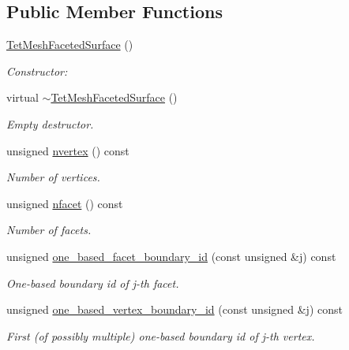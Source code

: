 \subsection*{Public Member Functions}
\begin{DoxyCompactItemize}
\item 
\hyperlink{classoomph_1_1TetMeshFacetedSurface_ab11f1e6e44a264849600909929c2067f}{Tet\+Mesh\+Faceted\+Surface} ()
\begin{DoxyCompactList}\small\item\em Constructor\+: \end{DoxyCompactList}\item 
virtual \hyperlink{classoomph_1_1TetMeshFacetedSurface_addb5688daf76ee730092f428162f9056}{$\sim$\+Tet\+Mesh\+Faceted\+Surface} ()
\begin{DoxyCompactList}\small\item\em Empty destructor. \end{DoxyCompactList}\item 
unsigned \hyperlink{classoomph_1_1TetMeshFacetedSurface_aae77dfb3a856e3840564e21716f4c3b1}{nvertex} () const
\begin{DoxyCompactList}\small\item\em Number of vertices. \end{DoxyCompactList}\item 
unsigned \hyperlink{classoomph_1_1TetMeshFacetedSurface_a6036f2a5e11bea9d72f9bba9a89faec7}{nfacet} () const
\begin{DoxyCompactList}\small\item\em Number of facets. \end{DoxyCompactList}\item 
unsigned \hyperlink{classoomph_1_1TetMeshFacetedSurface_a86b099447be23301fdfd4abdeee75560}{one\+\_\+based\+\_\+facet\+\_\+boundary\+\_\+id} (const unsigned \&j) const
\begin{DoxyCompactList}\small\item\em One-\/based boundary id of j-\/th facet. \end{DoxyCompactList}\item 
unsigned \hyperlink{classoomph_1_1TetMeshFacetedSurface_afa2552d4a9b397c635a8c427333c4bf5}{one\+\_\+based\+\_\+vertex\+\_\+boundary\+\_\+id} (const unsigned \&j) const
\begin{DoxyCompactList}\small\item\em First (of possibly multiple) one-\/based boundary id of j-\/th vertex. \end{DoxyCompactList}\item 

\end{DoxyCompactItemize}
